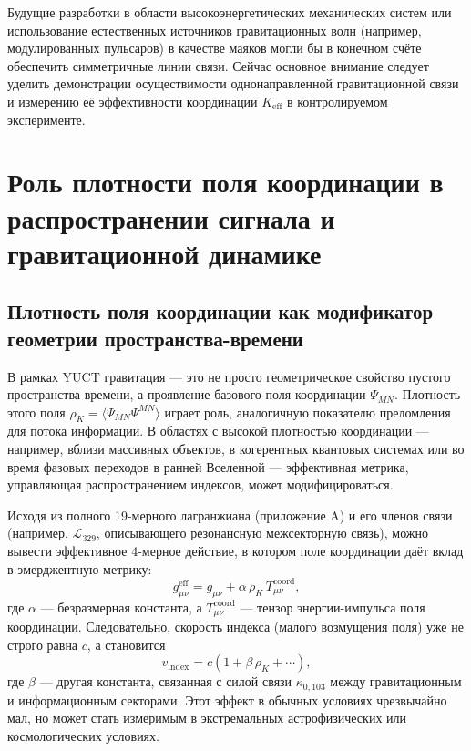 \documentclass[12pt,a4paper]{article}
\begin{document}
	Будущие разработки в области высокоэнергетических механических систем или использование естественных источников гравитационных волн (например, модулированных пульсаров) в качестве маяков могли бы в конечном счёте обеспечить симметричные линии связи. Сейчас основное внимание следует уделить демонстрации осуществимости однонаправленной гравитационной связи и измерению её эффективности координации \(K_{\mathrm{eff}}\) в контролируемом эксперименте.
	
	\section{Роль плотности поля координации в распространении сигнала и гравитационной динамике}
	\label{sec:coord-density}
	
	\subsection{Плотность поля координации как модификатор геометрии пространства-времени}
	
	В рамках YUCT гравитация — это не просто геометрическое свойство пустого пространства-времени, а проявление базового поля координации \(\Psi_{MN}\). Плотность этого поля \(\rho_K = \langle \Psi_{MN}\Psi^{MN} \rangle\) играет роль, аналогичную показателю преломления для потока информации. В областях с высокой плотностью координации — например, вблизи массивных объектов, в когерентных квантовых системах или во время фазовых переходов в ранней Вселенной — эффективная метрика, управляющая распространением индексов, может модифицироваться.
	
	Исходя из полного 19-мерного лагранжиана (приложение A) и его членов связи (например, \(\mathcal{L}_{329}\), описывающего резонансную межсекторную связь), можно вывести эффективное 4-мерное действие, в котором поле координации даёт вклад в эмерджентную метрику:
	\begin{equation}
		g_{\mu\nu}^{\mathrm{eff}} = g_{\mu\nu} + \alpha \, \rho_K \, T_{\mu\nu}^{\mathrm{coord}},
	\end{equation}
	где \(\alpha\) — безразмерная константа, а \(T_{\mu\nu}^{\mathrm{coord}}\) — тензор энергии-импульса поля координации. Следовательно, скорость индекса (малого возмущения поля) уже не строго равна \(c\), а становится
	\begin{equation}
		v_{\mathrm{index}} = c \left(1 + \beta \, \rho_K + \cdots \right),
	\end{equation}
	где \(\beta\) — другая константа, связанная с силой связи \(\kappa_{0,103}\) между гравитационным и информационным секторами. Этот эффект в обычных условиях чрезвычайно мал, но может стать измеримым в экстремальных астрофизических или космологических условиях.
	
\end{document}
